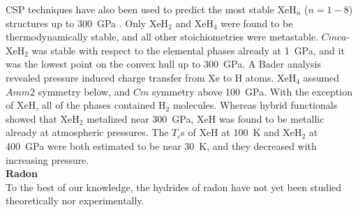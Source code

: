 \documentclass[12pt,letterpaper,oneside]{article}
\begin{document}
CSP techniques have also been used to predict the most stable XeH$_n$ ($n=1-8$) structures up to 300~GPa \cite{Yan:2015a}. Only XeH$_2$ and XeH$_4$ were found to be thermodynamically stable, and all other stoichiometries were metastable. $Cmca$-XeH$_2$ was stable with respect to the elemental phases already at 1~GPa, and it was the lowest point on the convex hull up to 300~GPa. A Bader analysis revealed pressure induced charge transfer from Xe to H atoms. XeH$_4$ assumed $Amm2$ symmetry below, and $Cm$ symmetry above 100~GPa. With the exception of XeH, all of the phases contained H$_2$ molecules. Whereas hybrid functionals showed that XeH$_2$ metalized near 300~GPa, XeH was found to be metallic already at atmospheric pressures. The $T_c$s of XeH at 100~K and XeH$_2$ at 400~GPa were both estimated to be near 30~K, and they decreased with increasing pressure.  \\




\noindent\textbf{Radon} \\ 
%
To the best of our knowledge, the hydrides of radon have not yet been studied theoretically nor experimentally.


\end{document}
